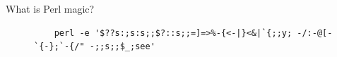 \documentclass[mathserif,hyperref={urlcolor=cyan,colorlinks=true}]{beamer}
\begin{document}
\begin{frame}[fragile]{What is Perl magic?}
\begin{figure}
\begin{center}
{\bf
{\tiny
    \begin{verbatim}
    perl -e '$??s:;s:s;;$?::s;;=]=>%-{<-|}<&|`{;;y; -/:-@[-`{-};`-{/" -;;s;;$_;see'
    \end{verbatim}
}
}
\end{center}
\end{figure}
\end{frame}
\end{document}

